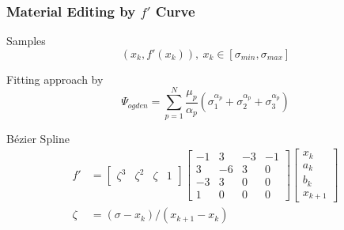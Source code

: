 \documentclass[serif,mathserif]{beamer}
\begin{document}
\begin{frame}
  \frametitle{Material Editing by $f'$ Curve}
  \begin{itemize}
     {
    \item Samples
      \begin{equation*}
        (x_k, f'(x_k)),~x_k \in [\sigma_{min}, \sigma_{max}]
      \end{equation*}
    }
     {\item Fitting approach by
    \begin{equation*}
      \Psi_{ogden} = \sum_{p=1}^N \frac{\mu_p}{\alpha_p} (\sigma_1^{\alpha_p}+\sigma_2^{\alpha_p}+\sigma_3^{\alpha_p})
    \end{equation*}}
     {\item B\'ezier Spline
      \begin{equation*}
        \begin{split}
      f' &= \begin{bmatrix}
        \zeta^3 & \zeta^2 & \zeta &1
      \end{bmatrix}
      \begin{bmatrix}
        -1 & 3 & -3 &-1 \\
        3  & -6 & 3 & 0 \\
        -3  & 3 & 0 & 0 \\
        1  & 0 & 0 & 0
      \end{bmatrix}
      \begin{bmatrix}
        x_k \\
        a_k \\
        b_k \\
        x_{k+1}
      \end{bmatrix} \\
      \zeta &=(\sigma-x_k)/(x_{k+1}-x_k)
        \end{split}
    \end{equation*}}
  \end{itemize}
\end{frame}
\end{document}
